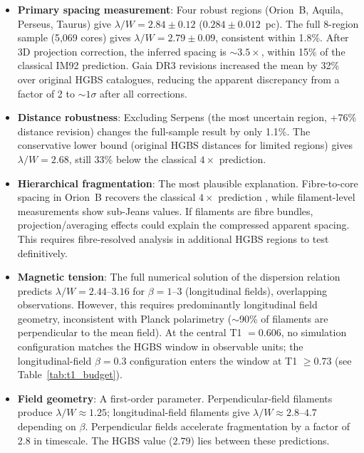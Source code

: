 \documentclass[twoside,twocolumn]{mnras}
\begin{document}
\begin{itemize}

    \item \textbf{Primary spacing measurement}: Four robust regions (Orion~B, Aquila,
    Perseus, Taurus) give $\lambda/W = 2.84 \pm 0.12$ ($0.284 \pm 0.012$~pc). The
    full 8-region sample (5,069 cores) gives $\lambda/W = 2.79 \pm 0.09$, consistent
    within 1.8\%. After 3D projection correction, the inferred spacing is ${\sim}3.5\times$,
    within 15\% of the classical IM92 prediction. Gaia DR3 revisions increased the mean
    by 32\% over original HGBS catalogues, reducing the apparent discrepancy from a
    factor of 2 to ${\sim}1\sigma$ after all corrections.

    \item \textbf{Distance robustness}: Excluding Serpens (the most uncertain region,
    +76\% distance revision) changes the full-sample result by only 1.1\%.
    The conservative lower bound (original HGBS distances for limited regions) gives
    $\lambda/W = 2.68$, still 33\% below the classical $4\times$ prediction.

    \item \textbf{Hierarchical fragmentation}: The most plausible explanation.
    Fibre-to-core spacing in Orion~B recovers the classical $4\times$ prediction
    \citep{Yang2024}, while filament-level measurements show sub-Jeans values.
    If filaments are fibre bundles, projection/averaging effects could explain the
    compressed apparent spacing. This requires fibre-resolved analysis in additional
    HGBS regions to test definitively.

    \item \textbf{Magnetic tension}: The full numerical solution of the dispersion
    relation predicts $\lambda/W = 2.44$--$3.16$ for $\beta = 1$--$3$ (longitudinal
    fields), overlapping observations. However, this requires predominantly longitudinal
    field geometry, inconsistent with Planck polarimetry ($\sim$90\% of filaments
    are perpendicular to the mean field). At the central T1 $= 0.606$, no simulation
    configuration matches the HGBS window in observable units; the longitudinal-field
    $\beta = 0.3$ configuration enters the window at T1 $\geq 0.73$ (see Table~\ref{tab:t1_budget}).

    \item \textbf{Field geometry}: A first-order parameter. Perpendicular-field
    filaments produce $\lambda/W \approx 1.25$; longitudinal-field filaments give
    $\lambda/W \approx 2.8$--$4.7$ depending on $\beta$. Perpendicular fields accelerate
    fragmentation by a factor of 2.8 in timescale. The HGBS value ($2.79$) lies between
    these predictions.


\end{itemize}
\end{document}
